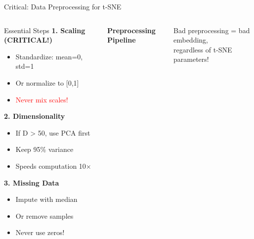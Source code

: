 \documentclass[aspectratio=169]{beamer}
\begin{document}
\begin{frame}{Critical: Data Preprocessing for t-SNE}
\begin{columns}
\begin{block}{Essential Steps}
\textbf{1. Scaling (CRITICAL!)}
\begin{itemize}
\item Standardize: mean=0, std=1
\item Or normalize to [0,1]
\item \textcolor{red}{Never mix scales!}
\end{itemize}

\textbf{2. Dimensionality}
\begin{itemize}
\item If D > 50, use PCA first
\item Keep 95\% variance
\item Speeds computation 10×
\end{itemize}

\textbf{3. Missing Data}
\begin{itemize}
\item Impute with median
\item Or remove samples
\item Never use zeros!
\end{itemize}
\end{block}

\begin{center}
\textbf{Preprocessing Pipeline}\\[3mm]
\end{center}

\vspace{3mm}
\begin{center}
\colorbox{red!20}{\parbox{0.8\textwidth}{\centering
Bad preprocessing = bad embedding,\\
regardless of t-SNE parameters!}}
\end{center}
\end{columns}
\end{frame}
\end{document}
